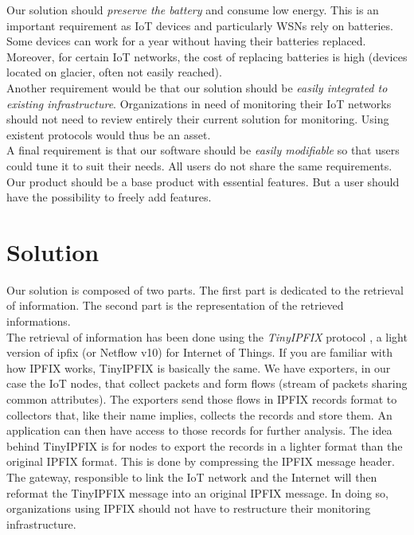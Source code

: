 Our solution should \textit{preserve the battery} and consume low energy. This is an important requirement as IoT devices and particularly WSNs rely on batteries. Some devices can work for a year without having their batteries replaced. Moreover, for certain IoT networks, the cost of replacing batteries is high (devices located on glacier, often not easily reached).\\

Another requirement would be that our solution should be \textit{easily integrated to existing infrastructure}. Organizations in need of monitoring their IoT networks should not need to review entirely their current solution for monitoring. Using existent protocols would thus be an asset. \\

A final requirement is that our software should be \textit{easily modifiable} so that users could tune it to suit their needs. All users do not share the same requirements. Our product should be a base product with essential features. But a user should have the possibility to freely add features.

\section*{Solution}

Our solution is composed of two parts. The first part is dedicated to the retrieval of information. The second part is the representation of the retrieved informations. \\

The retrieval of information has been done using the \textit{TinyIPFIX} protocol \cite{schmitt2016tinyipfix}, a light version of \acrshort{ipfix} (or Netflow v10) for Internet of Things. If you are familiar with how IPFIX works, TinyIPFIX is basically the same. We have exporters, in our case the IoT nodes, that collect packets and form flows (stream of packets sharing common attributes). The exporters send those flows in IPFIX records format to collectors that, like their name implies, collects the records and store them. An application can then have access to those records for further analysis. The idea behind TinyIPFIX is for nodes to export the records in a lighter format than the original IPFIX format. This is done by compressing the IPFIX message header. The gateway, responsible to link the IoT network and the Internet will then reformat the TinyIPFIX message into an original IPFIX message. In doing so, organizations using IPFIX should not have to restructure their monitoring infrastructure. \\


